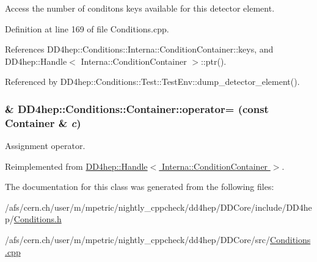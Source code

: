 Access the number of conditons keys available for this detector element. 

Definition at line 169 of file Conditions.cpp.

References DD4hep::Conditions::Interna::ConditionContainer::keys, and DD4hep::Handle$<$ Interna::ConditionContainer $>$::ptr().

Referenced by DD4hep::Conditions::Test::TestEnv::dump\_\-detector\_\-element().\hypertarget{class_d_d4hep_1_1_conditions_1_1_container_acdaccd39fc497da0eff7dfa97b5319f1}{
\subsubsection[{operator=}]{\& DD4hep::Conditions::Container::operator= (const {\bf Container} \& {\em c})}}
\label{class_d_d4hep_1_1_conditions_1_1_container_acdaccd39fc497da0eff7dfa97b5319f1}


Assignment operator. 

Reimplemented from \hyperlink{class_d_d4hep_1_1_handle_a9bbf8f498df42e81ad26fb00233505a6}{DD4hep::Handle$<$ Interna::ConditionContainer $>$}.

The documentation for this class was generated from the following files:\begin{DoxyCompactItemize}
\item 
/afs/cern.ch/user/m/mpetric/nightly\_\-cppcheck/dd4hep/DDCore/include/DD4hep/\hyperlink{_conditions_8h}{Conditions.h}\item 
/afs/cern.ch/user/m/mpetric/nightly\_\-cppcheck/dd4hep/DDCore/src/\hyperlink{_conditions_8cpp}{Conditions.cpp}\end{DoxyCompactItemize}
